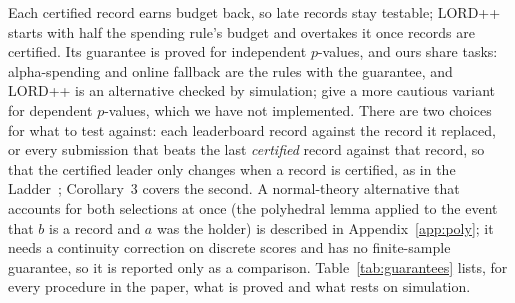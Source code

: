 \documentclass[11pt]{article}
\begin{document}
Each certified record earns budget back, so late records stay testable; LORD++ starts with half the spending rule's budget and overtakes it once records are certified.
Its guarantee is proved for independent $p$-values, and ours share tasks: alpha-spending and online fallback are the rules with the guarantee, and LORD++ is an alternative checked by simulation; \citet{javanmard2018online} give a more cautious variant for dependent $p$-values, which we have not implemented.
There are two choices for what to test against: each leaderboard record against the record it replaced, or every submission that beats the last \emph{certified} record against that record, so that the certified leader only changes when a record is certified, as in the Ladder~\citep{blum2015ladder}; Corollary~3 covers the second.
A normal-theory alternative that accounts for both selections at once (the polyhedral lemma applied to the event that $b$ is a record and $a$ was the holder) is described in Appendix~\ref{app:poly}; it needs a continuity correction on discrete scores and has no finite-sample guarantee, so it is reported only as a comparison.
Table~\ref{tab:guarantees} lists, for every procedure in the paper, what is proved and what rests on simulation.
\end{document}
